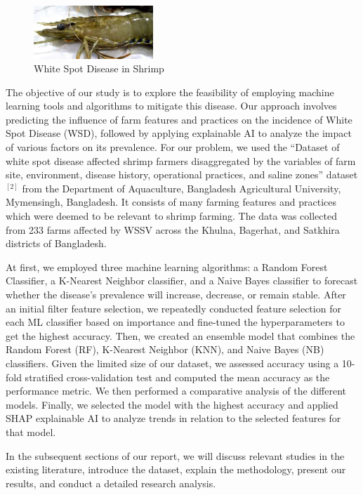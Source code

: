 \documentclass[journal,comsoc]{IEEEtran}
\begin{document}
\begin{figure}[H]
  \centering
  \includegraphics[width=0.4\textwidth]{shrimp.jpg}
  \caption{White Spot Disease in Shrimp}
  \label{fig:shrimp}
\end{figure}

The objective of our study is to explore the feasibility of employing machine learning tools and algorithms to mitigate this disease. Our approach involves predicting the influence of farm features and practices on the incidence of White Spot Disease (WSD), followed by applying explainable AI to analyze the impact of various factors on its prevalence. For our problem, we used the “Dataset of white spot disease affected shrimp farmers disaggregated by the variables of farm site, environment, disease history, operational practices, and saline zones” dataset $^{[2]}$ from the Department of Aquaculture, Bangladesh Agricultural University, Mymensingh, Bangladesh. It consists of many farming features and practices which were deemed to be relevant to shrimp farming. The data was collected from 233 farms affected by WSSV across the Khulna, Bagerhat, and Satkhira districts of Bangladesh.

At first, we employed three machine learning algorithms: a Random Forest Classifier, a K-Nearest Neighbor classifier, and a Naive Bayes classifier to forecast whether the disease's prevalence will increase, decrease, or remain stable. After an initial filter feature selection, we repeatedly conducted feature selection for each ML classifier based on importance and fine-tuned the hyperparameters to get the highest accuracy. Then, we created an ensemble model that combines the Random Forest (RF), K-Nearest Neighbor (KNN), and Naive Bayes (NB) classifiers. Given the limited size of our dataset, we assessed accuracy using a 10-fold stratified cross-validation test and computed the mean accuracy as the performance metric. We then performed a comparative analysis of the different models. Finally, we selected the model with the highest accuracy and applied SHAP explainable AI to analyze trends in relation to the selected features for that model.

In the subsequent sections of our report, we will discuss relevant studies in the existing literature, introduce the dataset, explain the methodology, present our results, and conduct a detailed research analysis.
\end{document}

